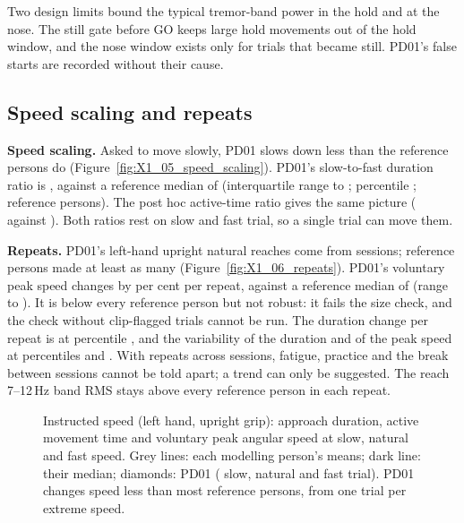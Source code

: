 Two design limits bound the typical tremor-band power in the hold and at the nose.
The still gate before GO keeps large hold movements out of the hold window, and the nose window exists only for trials that became still.
PD01's false starts are recorded without their cause.

\subsection{Speed scaling and repeats}\label{app:pd01:speed}

\textbf{Speed scaling.}
Asked to move slowly, PD01 slows down less than the reference persons do (Figure~\ref{fig:X1_05_speed_scaling}).
PD01's slow-to-fast duration ratio is , against a reference median of  (interquartile range  to ; percentile ;  reference persons).
The post hoc active-time ratio gives the same picture ( against ).
Both ratios rest on  slow and  fast trial, so a single trial can move them.

\textbf{Repeats.}
PD01's  left-hand upright natural reaches come from  sessions;  reference persons made at least as many (Figure~\ref{fig:X1_06_repeats}).
PD01's voluntary peak speed changes by  per cent per repeat, against a reference median of  (range  to ).
It is below every reference person but not robust: it fails the size check, and the check without clip-flagged trials cannot be run.
The duration change per repeat is at percentile , and the variability of the duration and of the peak speed at percentiles  and .
With  repeats across  sessions, fatigue, practice and the break between sessions cannot be told apart; a trend can only be suggested.
The reach 7--12\,Hz band RMS stays above every reference person in each repeat.

\begin{figure}[htbp]
  \centering
  \caption{Instructed speed (left hand, upright grip): approach duration, active movement time and voluntary peak angular speed at slow, natural and fast speed.
    Grey lines: each modelling person's means; dark line: their median; diamonds: PD01 ( slow,  natural and  fast trial).
    PD01 changes speed less than most reference persons, from one trial per extreme speed.}
  \label{fig:X1_05_speed_scaling}\label{fig:app:pd01-speed}
\end{figure}

